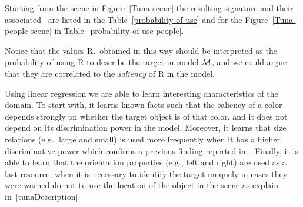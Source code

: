 Starting from the scene in Figure~\ref{Tuna-scene}
the resulting signature and their associated \puse\ are listed in the Table~\ref{probability-of-use} and for the Figure~\ref{Tuna-people-scene} in Table~\ref{probability-of-use-people}. 

Notice that the values R.\puse\ obtained in this way should be interpreted as the probability of using R to describe the target in model 
$\mathcal{M}$, and we could argue that they are correlated to the \emph{saliency} of R in the model.  

Using linear regression we are able to learn interesting characteristics of the domain. To start with, it learns known facts such that the 
saliency of a color depends strongly on whether the target object is of that color, and it does not depend on its discrimination power 
in the model. Moreover, it learns that size relations (e.g., large and small) is used more frequently when it has a higher discriminative power
which confirms a previous finding reported in~\cite{viet:gene11}. Finally, it is able to learn that the orientation properties (e.g., left and right) are used as a last resource, when it is necessary to identify the target uniquely in cases they were warned do not tu use the location of the object in the scene as explain in~\ref{tunaDescription}. 

